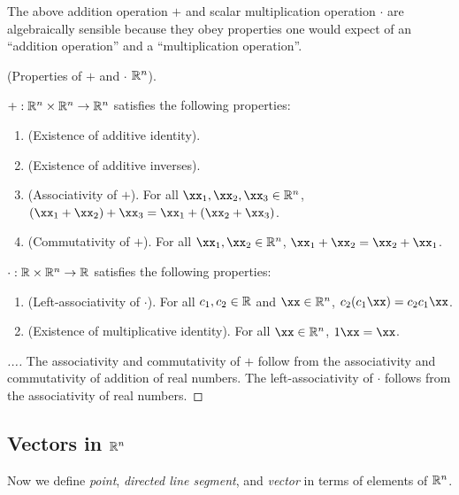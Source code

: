 The above addition operation $+$ and scalar multiplication operation $\cdot$ are algebraically sensible because they obey properties one would expect of an ``addition operation'' and a ``multiplication operation''.

\begin{theorem}
    (Properties of $+$ and $\cdot$ $\mathbb{R}^n$).
    
    $+:\mathbb{R}^n \times \mathbb{R}^n \rightarrow \mathbb{R}^n$ satisfies the following properties:
    
    \begin{enumerate}
        \item (Existence of additive identity). 
        \item (Existence of additive inverses).
        \item (Associativity of $+$). For all $\xx_1, \xx_2, \xx_3 \in \R^n$, $(\xx_1 + \xx_2) + \xx_3 = \xx_1 + (\xx_2 + \xx_3)$.
        \item (Commutativity of $+$). For all $\xx_1, \xx_2 \in \R^n$, $\xx_1 + \xx_2 = \xx_2 + \xx_1$.
    \end{enumerate}
    
    $\cdot:\mathbb{R} \times \mathbb{R}^n \rightarrow \mathbb{R}$ satisfies the following properties:
    
    \begin{enumerate}
        \item (Left-associativity of $\cdot$). For all $c_1, c_2 \in \mathbb{R}$ and $\xx \in \R^n$, $c_2(c_1 \xx) = c_2 c_1 \xx$.
        \item (Existence of multiplicative identity). For all $\xx \in \R^n$, $1 \xx = \xx$.
    \end{enumerate}
\end{theorem}

\begin{proof}
    [...]

    The associativity and commutativity of $+$ follow from the associativity and commutativity of addition of real numbers. The left-associativity of $\cdot$ follows from the associativity of real numbers.
\end{proof}

\subsection*{Vectors in $\mathbb{R}^n$}

Now we define \textit{point}, \textit{directed line segment}, and \textit{vector} in terms of elements of $\mathbb{R}^n$.

